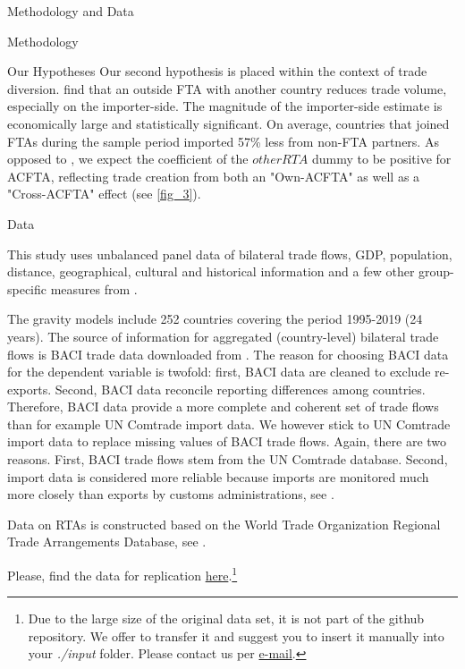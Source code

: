 \begin{section}{Methodology and Data }
\begin{subsection}{Methodology }
\begin{subsubsection}{Our Hypotheses}
Our second hypothesis is placed within the context of trade diversion. \cite{dyz_2014} find that an outside FTA with another country reduces trade volume, especially on the importer-side. The magnitude of the importer-side estimate is economically large and statistically significant. On average, countries that joined FTAs during the sample period imported 57\% less from non-FTA partners. As opposed to \cite{dyz_2014}, we expect the coefficient of the $otherRTA$ dummy to be positive for ACFTA, reflecting trade creation from both an "Own-ACFTA" as well as a "Cross-ACFTA" effect (see \autoref{fig_3}).
\end{subsubsection}


\end{subsection}



\begin{subsection}{Data}

This study uses unbalanced panel data of bilateral trade flows, GDP, population, distance, geographical, cultural and historical information and a few other group-specific measures from \cite{cepii-data_2022}.

The gravity models include 252 countries covering the period 1995-2019 (24 years). The source of information for aggregated (country-level) bilateral trade flows is BACI trade data downloaded from \cite{cepii-data_2022}. The reason for choosing BACI data for the dependent variable is twofold: first, BACI data are cleaned to exclude re-exports. Second, BACI data reconcile reporting differences among countries. Therefore, BACI data provide a more complete and coherent set of trade flows than for example UN Comtrade import data. We however stick to UN Comtrade import data to replace missing values of BACI trade flows. Again, there are two reasons. First, BACI trade flows stem from the UN Comtrade database. Second, import data is considered more reliable because imports are monitored much more closely than exports by customs administrations, see \cite{ypl_2016}.

Data on RTAs is constructed based on the World Trade Organization Regional Trade Arrangements Database, see \cite{wto-data_2022}. 

Please, find the data for replication \href{https://github.com/gerodasbach/data_repository_RIA_report.git}{here}.\footnote{Due to the large size of the original data set, it is not part of the github repository. We offer to transfer it and suggest you to insert it manually into your \textit{./input} folder. Please contact us per \href{mailto:gero.dasbach@gmail.com}{e-mail}.}

\end{subsection}
\end{section}